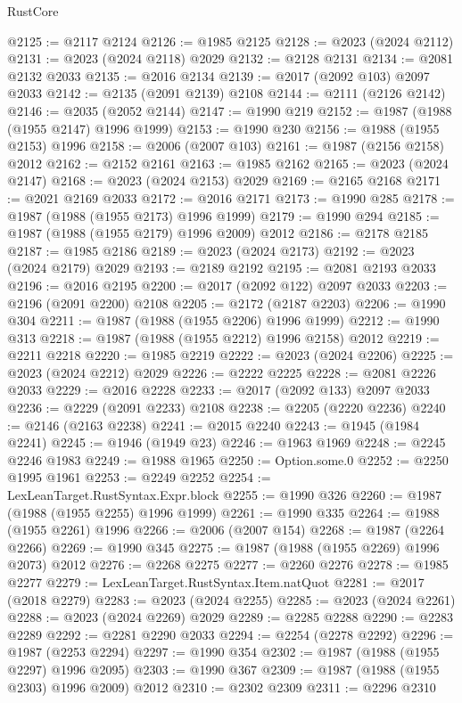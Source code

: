 \begin{lexlean}{RustCore}
\begin{coremodule}
@2125 := @2117 @2124
@2126 := @1985 @2125
@2128 := @2023 (@2024 @2112)
@2131 := @2023 (@2024 @2118) @2029
@2132 := @2128 @2131
@2134 := @2081 @2132 @2033
@2135 := @2016 @2134
@2139 := @2017 (@2092 @103) @2097 @2033
@2142 := @2135 (@2091 @2139) @2108
@2144 := @2111 (@2126 @2142)
@2146 := @2035 (@2052 @2144)
@2147 := @1990 @219
@2152 := @1987 (@1988 (@1955 @2147) @1996 @1999)
@2153 := @1990 @230
@2156 := @1988 (@1955 @2153) @1996
@2158 := @2006 (@2007 @103)
@2161 := @1987 (@2156 @2158) @2012
@2162 := @2152 @2161
@2163 := @1985 @2162
@2165 := @2023 (@2024 @2147)
@2168 := @2023 (@2024 @2153) @2029
@2169 := @2165 @2168
@2171 := @2021 @2169 @2033
@2172 := @2016 @2171
@2173 := @1990 @285
@2178 := @1987 (@1988 (@1955 @2173) @1996 @1999)
@2179 := @1990 @294
@2185 := @1987 (@1988 (@1955 @2179) @1996 @2009) @2012
@2186 := @2178 @2185
@2187 := @1985 @2186
@2189 := @2023 (@2024 @2173)
@2192 := @2023 (@2024 @2179) @2029
@2193 := @2189 @2192
@2195 := @2081 @2193 @2033
@2196 := @2016 @2195
@2200 := @2017 (@2092 @122) @2097 @2033
@2203 := @2196 (@2091 @2200) @2108
@2205 := @2172 (@2187 @2203)
@2206 := @1990 @304
@2211 := @1987 (@1988 (@1955 @2206) @1996 @1999)
@2212 := @1990 @313
@2218 := @1987 (@1988 (@1955 @2212) @1996 @2158) @2012
@2219 := @2211 @2218
@2220 := @1985 @2219
@2222 := @2023 (@2024 @2206)
@2225 := @2023 (@2024 @2212) @2029
@2226 := @2222 @2225
@2228 := @2081 @2226 @2033
@2229 := @2016 @2228
@2233 := @2017 (@2092 @133) @2097 @2033
@2236 := @2229 (@2091 @2233) @2108
@2238 := @2205 (@2220 @2236)
@2240 := @2146 (@2163 @2238)
@2241 := @2015 @2240
@2243 := @1945 (@1984 @2241)
@2245 := @1946 (@1949 @23)
@2246 := @1963 @1969
@2248 := @2245 @2246 @1983
@2249 := @1988 @1965
@2250 := Option.some.{0}
@2252 := @2250 @1995 @1961
@2253 := @2249 @2252
@2254 := LexLeanTarget.RustSyntax.Expr.block
@2255 := @1990 @326
@2260 := @1987 (@1988 (@1955 @2255) @1996 @1999)
@2261 := @1990 @335
@2264 := @1988 (@1955 @2261) @1996
@2266 := @2006 (@2007 @154)
@2268 := @1987 (@2264 @2266)
@2269 := @1990 @345
@2275 := @1987 (@1988 (@1955 @2269) @1996 @2073) @2012
@2276 := @2268 @2275
@2277 := @2260 @2276
@2278 := @1985 @2277
@2279 := LexLeanTarget.RustSyntax.Item.natQuot
@2281 := @2017 (@2018 @2279)
@2283 := @2023 (@2024 @2255)
@2285 := @2023 (@2024 @2261)
@2288 := @2023 (@2024 @2269) @2029
@2289 := @2285 @2288
@2290 := @2283 @2289
@2292 := @2281 @2290 @2033
@2294 := @2254 (@2278 @2292)
@2296 := @1987 (@2253 @2294)
@2297 := @1990 @354
@2302 := @1987 (@1988 (@1955 @2297) @1996 @2095)
@2303 := @1990 @367
@2309 := @1987 (@1988 (@1955 @2303) @1996 @2009) @2012
@2310 := @2302 @2309
@2311 := @2296 @2310

\end{coremodule}
\end{lexlean}
